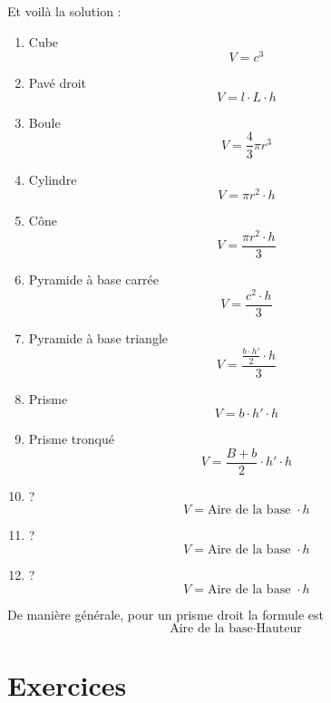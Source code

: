 Et voilà la solution :
\begin{enumerate}
\item Cube $$ V= c^3$$
\item Pavé droit $$ V= l\cdot L \cdot h$$
\item Boule $$ V= \frac{4}{3}\pi r^3$$
\item Cylindre $$ V= \pi r^2 \cdot h$$
\item Cône $$ V= \frac{\pi r^2 \cdot h}{3}$$
\item Pyramide à base carrée $$ V= \frac{c^2 \cdot h}{3}$$
\item Pyramide à base triangle $$ V= \frac{\frac{b\cdot h'}{2}\cdot h}{3}$$
\item Prisme $$ V= b\cdot h' \cdot h$$
\item Prisme tronqué $$ V= \frac{B+b}{2} \cdot h' \cdot h$$
\item ? $$ V= \mbox{Aire de la base } \cdot h$$
\item ? $$ V= \mbox{Aire de la base } \cdot h$$
\item ? $$ V= \mbox{Aire de la base } \cdot h$$
\end{enumerate}

De manière générale, pour un prisme droit la formule est 
$$
\mbox{Aire de la base} \cdot \mbox{Hauteur}
$$

\section{Exercices}

